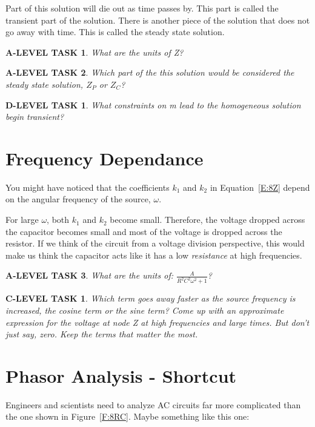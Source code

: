 \documentclass{book}
\numberwithin{equation}{section}
\newtheorem{alevel}{A-LEVEL TASK}
\newtheorem{clevel}{C-LEVEL TASK}
\newtheorem{dlevel}{D-LEVEL TASK}
\theoremstyle{definition}
\begin{document}
Part of this solution will die out as time passes by. This part is called the transient part of the solution. There is another piece of the solution that does not go away with time. This is called the steady state solution.

\begin{alevel}
What are the units of Z?
\end{alevel} 

\begin{alevel}
Which part of the this  solution would be considered the steady state solution, $Z_P$ or $Z_C$?
\end{alevel} 

\begin{dlevel}
What constraints on m lead to the homogeneous solution begin transient?
\end{dlevel}

\section{Frequency Dependance}
You might have noticed that the coefficients $k_1$ and $k_2$ in Equation~\eqref{E:8Z} depend on the angular frequency of the source, $\omega$.\par

For large $\omega$, both $k_1$ and $k_2$ become small. Therefore, the voltage dropped across the capacitor becomes small and most of the voltage is dropped across the resistor. If we think of the circuit from a voltage division perspective, this would make us think the capacitor acts like it has a low \emph{resistance} at high frequencies.\par

\begin{alevel}
What are the units of: $\frac{A}{R^2C^2\omega^2+1}$?
\end{alevel}

\begin{clevel}
Which term goes away faster as the source frequency is increased, the cosine term or the sine term? Come up with an approximate expression for the voltage at node Z at high frequencies and large times. But don't just say, zero. Keep the terms that matter the most.
\end{clevel}


\section{Phasor Analysis - Shortcut}
Engineers and scientists need to analyze AC circuits far more complicated than the one shown in Figure~\ref{F:8RC}. Maybe something like this one:
\end{document}

